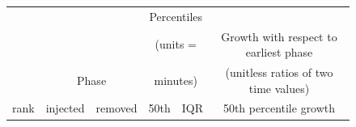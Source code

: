 \documentclass[smallcondensed]{svjour3}
\def\baselinestretch{1}
\begin{document}
   
    


\begin{figure} 
\begin{center}

\scriptsize
\begin{tabular}{c|lr|rr|rl}
& \multicolumn{2}{c|}{ } & \multicolumn{2}{c|}{Percentiles} & \multicolumn{2}{c}{~ } \\ 
  & \multicolumn{2}{c|}{ } & \multicolumn{2}{c|}{(units = } & \multicolumn{2}{c}{Growth with respect to earliest phase  } \\ 
   & \multicolumn{2}{c|}{Phase} & \multicolumn{2}{c|}{  minutes)} & \multicolumn{2}{c}{(unitless  ratios of two time values) } \\\hline


  rank & injected & removed & 50th &   IQR & \multicolumn{2}{c}{50th percentile growth}  \\ 
\hline


\end{tabular}
\end{center}
\end{figure}
\end{document}
